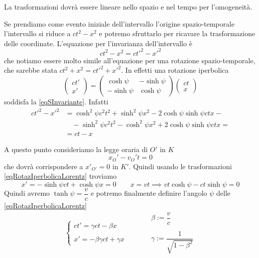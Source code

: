 \documentclass[12pt,a4paper,titlepage, twoside, openright]{book}
\numberwithin{equation}{chapter}
\begin{document}
La trasformazioni dovrà essere lineare nello spazio e nel tempo per l'omogeneità. 

Se prendiamo come evento iniziale dell'intervallo l'origine spazio-temporale l'intervallo si riduce a $ct^2-x^2$ e potremo sfruttarlo per ricavare la trasformazione delle coordinate.
L'equazione per l'invarianza dell'intervallo è 
\begin{equation}ct^2-x^2=ct'^2-x'^2 
\label{eqSInvariante} \end{equation}
 che notiamo essere molto simile all'equazione per una rotazione spazio-temporale, che sarebbe stata $ct^2+x^2=ct'^2+x'^2$.
In effetti una rotazione iperbolica 
\begin{equation}\label{eqRotazIperbolicaLorentz}
\left(\begin{array}{c}
ct' \\ x'
\end{array}\right)=\left(\begin{array}{cc}
\cosh{\psi} & -\sinh{\psi} \\ -\sinh{\psi} & \cosh{\psi}
\end{array}\right)\left(\begin{array}{c}
ct \\ x
\end{array}\right)
\end{equation}
soddisfa la \eqref{eqSInvariante}. Infatti
\begin{align*}
ct'^2-x'^2&= \cosh^2{\psi}c^2t^2 + \sinh^2{\psi}x^2 -2\cosh{\psi}\sinh{\psi}ctx -\\&\quad - \sinh^2{\psi}c^2t^2-\cosh^2{\psi}x^2+2\cosh{\psi}\sinh{\psi}ctx = \\
&= ct-x
\end{align*}

A questo punto consideriamo la legge oraria di $O'$ in $K$ 
\[
x_{O}'-v_{O}'t=0
\]
che dovrà corrispondere a $x'_{O'}=0$ in $K'$. Quindi usando le trasformazioni \eqref{eqRotazIperbolicaLorentz} troviamo
\[
x'=-\sinh{\psi}ct+\cosh{\psi}x=0 \qquad x=vt \implies vt\cosh{\psi}-ct\sinh{\psi}=0
\]
Quindi avremo $\tanh{\psi}=\dfrac{v}{c}$ e potremo finalmente definire l'angolo $\psi$ delle \eqref{eqRotazIperbolicaLorentz}
\begin{equation}
\begin{cases}
ct'=\gamma ct-\beta x \\
\\
x' =-\beta\gamma ct +\gamma x
\end{cases} \quad \qquad
\begin{array}{c}
\beta:=\dfrac{v}{c}\\
\\
\gamma:=\dfrac{1}{\sqrt{1-\beta^2}}\end{array}
\end{equation}
\end{document}
